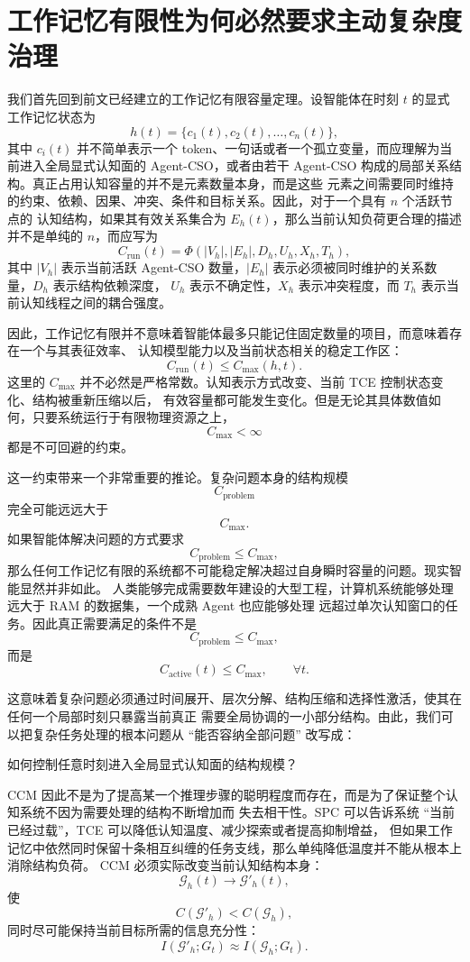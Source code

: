 \section{工作记忆有限性为何必然要求主动复杂度治理}

我们首先回到前文已经建立的工作记忆有限容量定理。设智能体在时刻 $t$ 的显式工作记忆状态为
\[
h(t)=\{c_1(t),c_2(t),\ldots,c_n(t)\},
\]
其中 $c_i(t)$ 并不简单表示一个 token、一句话或者一个孤立变量，而应理解为当前进入全局显式认知面的
Agent-CSO，或者由若干 Agent-CSO 构成的局部关系结构。真正占用认知容量的并不是元素数量本身，而是这些
元素之间需要同时维持的约束、依赖、因果、冲突、条件和目标关系。因此，对于一个具有 $n$ 个活跃节点的
认知结构，如果其有效关系集合为 $E_h(t)$，那么当前认知负荷更合理的描述并不是单纯的 $n$，而应写为
\[
C_{\mathrm{run}}(t)
=
\Phi
\left(
|V_h|,
|E_h|,
D_h,
U_h,
X_h,
T_h
\right),
\]
其中 $|V_h|$ 表示当前活跃 Agent-CSO 数量，$|E_h|$ 表示必须被同时维护的关系数量，$D_h$ 表示结构依赖深度，
$U_h$ 表示不确定性，$X_h$ 表示冲突程度，而 $T_h$ 表示当前认知线程之间的耦合强度。

因此，工作记忆有限并不意味着智能体最多只能记住固定数量的项目，而意味着存在一个与其表征效率、
认知模型能力以及当前状态相关的稳定工作区：
\[
\boxed{
C_{\mathrm{run}}(t)\leq C_{\max}(h,t).
}
\]
这里的 $C_{\max}$ 并不必然是严格常数。认知表示方式改变、当前 TCE 控制状态变化、结构被重新压缩以后，
有效容量都可能发生变化。但是无论其具体数值如何，只要系统运行于有限物理资源之上，
\[
C_{\max}<\infty
\]
都是不可回避的约束。

这一约束带来一个非常重要的推论。复杂问题本身的结构规模
\[
C_{\mathrm{problem}}
\]
完全可能远远大于
\[
C_{\max}.
\]
如果智能体解决问题的方式要求
\[
C_{\mathrm{problem}}\leq C_{\max},
\]
那么任何工作记忆有限的系统都不可能稳定解决超过自身瞬时容量的问题。现实智能显然并非如此。
人类能够完成需要数年建设的大型工程，计算机系统能够处理远大于 RAM 的数据集，一个成熟 Agent 也应能够处理
远超过单次认知窗口的任务。因此真正需要满足的条件不是
\[
C_{\mathrm{problem}}\leq C_{\max},
\]
而是
\[
\boxed{
C_{\mathrm{active}}(t)\leq C_{\max},
\qquad
\forall t.
}
\]

这意味着复杂问题必须通过时间展开、层次分解、结构压缩和选择性激活，使其在任何一个局部时刻只暴露当前真正
需要全局协调的一小部分结构。由此，我们可以把复杂任务处理的根本问题从 ``能否容纳全部问题'' 改写成：
\begin{statementbox}
如何控制任意时刻进入全局显式认知面的结构规模？
\end{statementbox}

CCM 因此不是为了提高某一个推理步骤的聪明程度而存在，而是为了保证整个认知系统不因为需要处理的结构不断增加而
失去相干性。SPC 可以告诉系统 ``当前已经过载''，TCE 可以降低认知温度、减少探索或者提高抑制增益，
但如果工作记忆中依然同时保留十条相互纠缠的任务支线，那么单纯降低温度并不能从根本上消除结构负荷。
CCM 必须实际改变当前认知结构本身：
\[
\mathcal{G}_{h}(t)
\longrightarrow
\mathcal{G}'_{h}(t),
\]
使
\[
C(\mathcal{G}'_{h})
<
C(\mathcal{G}_{h}),
\]
同时尽可能保持当前目标所需的信息充分性：
\[
I(\mathcal{G}'_{h};G_t)
\approx
I(\mathcal{G}_{h};G_t).
\]

